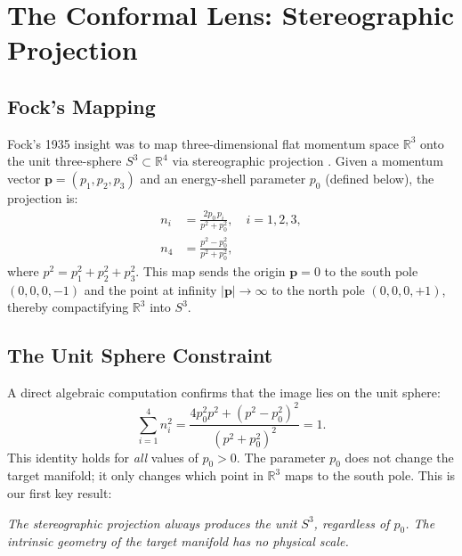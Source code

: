 \documentclass[aps,pra,twocolumn,superscriptaddress,longbibliography]{revtex4-2}
\begin{document}
\section{The Conformal Lens: Stereographic Projection}
\label{sec:conformal}

\subsection{Fock's Mapping}

Fock's 1935 insight was to map three-dimensional flat momentum space $\mathbb{R}^3$ onto the unit three-sphere $S^3 \subset \mathbb{R}^4$ via stereographic projection \cite{fock1935}. Given a momentum vector $\mathbf{p} = (p_1, p_2, p_3)$ and an energy-shell parameter $p_0$ (defined below), the projection is:
\begin{align}
n_i &= \frac{2p_0\, p_i}{p^2 + p_0^2}, \quad i = 1, 2, 3, \label{eq:stereo_spatial}\\
n_4 &= \frac{p^2 - p_0^2}{p^2 + p_0^2}, \label{eq:stereo_fourth}
\end{align}
where $p^2 = p_1^2 + p_2^2 + p_3^2$. This map sends the origin $\mathbf{p} = 0$ to the south pole $(0, 0, 0, -1)$ and the point at infinity $|\mathbf{p}| \to \infty$ to the north pole $(0, 0, 0, +1)$, thereby compactifying $\mathbb{R}^3$ into $S^3$.

\subsection{The Unit Sphere Constraint}

A direct algebraic computation confirms that the image lies on the unit sphere:
\begin{equation}
\sum_{i=1}^{4} n_i^2 = \frac{4p_0^2 p^2 + (p^2 - p_0^2)^2}{(p^2 + p_0^2)^2} = 1.
\label{eq:unit_sphere}
\end{equation}
This identity holds for \textit{all} values of $p_0 > 0$. The parameter $p_0$ does not change the target manifold; it only changes which point in $\mathbb{R}^3$ maps to the south pole. This is our first key result:

\medskip
\noindent\textit{The stereographic projection always produces the unit $S^3$, regardless of $p_0$. The intrinsic geometry of the target manifold has no physical scale.}
\medskip
\end{document}
